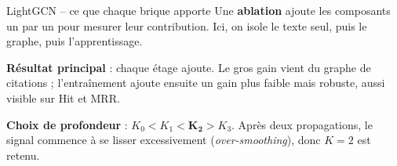 \documentclass[aspectratio=169,10pt]{beamer}
\newcommand{\keybox}[1]{%
  \begin{center}
  \colorbox{accentsoft}{\parbox{0.92\linewidth}{\centering #1}}
  \end{center}}
\begin{document}
\begin{frame}{LightGCN -- ce que chaque brique apporte}
  \footnotesize
  Une \textbf{ablation} ajoute les composants un par un pour mesurer leur contribution.
  Ici, on isole le texte seul, puis le graphe, puis l'apprentissage.

  \vspace{0.45em}
  \begin{center}\scriptsize
  \renewcommand{\arraystretch}{1.35}
  \setlength{\tabcolsep}{5pt}
  \end{center}

  \vspace{0.45em}
  \keybox{\scriptsize \textbf{Résultat principal} : chaque étage ajoute.
  Le gros gain vient du graphe de citations ; l'entraînement ajoute ensuite un
  gain plus faible mais robuste, aussi visible sur Hit et MRR.}

  \vspace{0.3em}
  {\scriptsize
  \textbf{Choix de profondeur} : $K_0 < K_1 < \mathbf{K_2} > K_3$.
  Après deux propagations, le signal commence à se lisser excessivement
  (\emph{over-smoothing}), donc $K{=}2$ est retenu.
  }
\end{frame}
\end{document}
